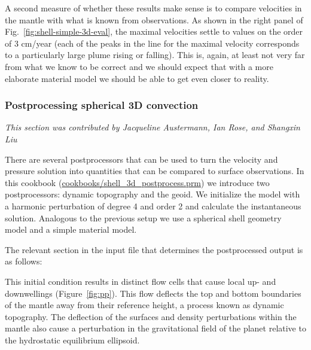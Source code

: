 \documentclass{article}
\begin{document}
A second measure of whether these results make sense is to compare velocities in
the mantle with what is known from observations. As shown in the right panel of
Fig.~\ref{fig:shell-simple-3d-eval}, the maximal velocities settle to values on
the order of 3 cm/year (each of the peaks in the line for the maximal velocity
corresponds to a particularly large plume rising or falling). This is, again, at
least not very far from what we know to be correct and we should expect that
with a more elaborate material model we should be able to get even closer to
reality.

\subsubsection{Postprocessing spherical 3D convection}
\label{sec:cookbooks-shell_3d_postprocess.prm}
\textit{This section was contributed by Jacqueline Austermann, Ian Rose, and Shangxin Liu}


There are several postprocessors that can be used to turn the velocity 
and pressure solution into quantities that can be compared to surface 
observations. In this cookbook (\url{cookbooks/shell_3d_postprocess.prm}) 
we introduce two postprocessors: dynamic topography and the geoid.
We initialize the model with a harmonic 
perturbation of degree 4 and order 2 and calculate the
instantaneous solution. Analogous to the previous setup we use a spherical
shell geometry model and a simple material model. 

The relevant section in the input file that determines the postprocessed
output is as follows:



This initial condition results in distinct flow cells that cause local up- and
downwellings (Figure~\ref{fig:pp}). This flow deflects the top and bottom boundaries
of the mantle away from their reference height, a process known as dynamic topography.
The deflection of the surfaces and density perturbations within the mantle also 
cause a perturbation in the gravitational field of the planet relative to the
hydrostatic equilibrium ellipsoid. 
\end{document}
